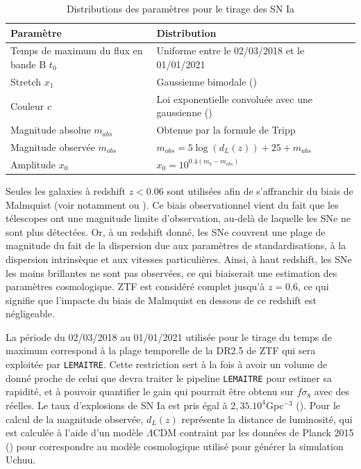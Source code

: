 \documentclass{book}
\begin{document}
\begin{table}
    \centering
    \begin{tabular}{p{6.5cm}|p{7cm}}
         Paramètre & Distribution \\
         \hline
         Temps de maximum du flux en bande B $t_0$ & Uniforme entre le 02/03/2018 et le 01/01/2021\\
         Stretch $x_1$ & Gaussienne bimodale (\cite{nicolas_redshift_2021})\\
         Couleur $c$ &  Loi exponentielle convoluée avec une gaussienne (\cite{ginolin_ztf_2024}) \\
         Magnitude absolue $m_{abs}$ & Obtenue par la formule de Tripp\\
         Magnitude observée $m_{obs}$ & $m_{obs} = 5 \log(d_L(z)) + 25 + m_{abs}$\\
         Amplitude $x_0$ & $x_0 = 10^{0.4(m_b - m_{obs})}$
    \end{tabular}
    \caption{Distributions des paramètres pour le tirage des SN Ia}
    \label{tab:snia}
\end{table}

Seules les galaxies à redshift $z<0.06$ sont utilisées afin de s'affranchir du biais de Malmquist (voir notamment \cite{carreres_growth-rate_2023} ou \cite{boyd_accounting_2024}). Ce biais observationnel vient du fait que les télescopes ont une magnitude limite d'observation, au-delà de laquelle les SNe ne sont plus détectées. Or, à un redshift donné, les SNe couvrent une plage de magnitude du fait de la dispersion due aux paramètres de standardisations, à la dispersion intrinsèque et aux vitesses particulières. Ainsi, à haut redshift, les SNe les moins brillantes ne sont pas observées, ce qui biaiserait une estimation des paramètres cosmologique. ZTF est considéré complet jusqu'à $z=0.6$, ce qui signifie que l'impacte du biais de Malmquist en dessous de ce redshift est négligeable.

La période du 02/03/2018 au 01/01/2021 utilisée pour le tirage du temps de maximum correspond à la plage temporelle de la DR2.5 de ZTF qui sera exploitée par \verb|LEMAITRE|. Cette restriction sert à la fois à avoir un volume de donné proche de celui que devra traiter le pipeline \verb|LEMAITRE| pour estimer sa rapidité, et à pouvoir quantifier le gain qui pourrait être obtenu sur $f\sigma_8$ avec des réelles. Le taux d'explosions de SN Ia est pris égal à $2,35 .10^4$Gpc$^{-3}$ (\cite{perley_zwicky_2020}).
Pour le calcul de la magnitude observée, $d_L(z)$ représente la distance de luminosité, qui est calculée à l'aide d'un modèle $\Lambda$CDM contraint par les données de Planck 2015 (\cite{planck_collaboration_planck_2016}) pour correspondre au modèle cosmologique utilisé pour générer la simulation Uchuu.
\end{document}
